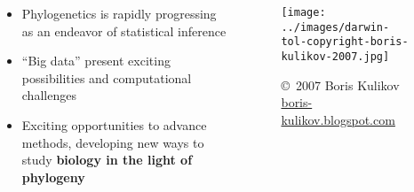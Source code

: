\begin{frame}
    \begin{columns}[c]
        
        \begin{itemize}[<+->]
            \item Phylogenetics is rapidly progressing as an endeavor of
                statistical inference
            \item ``Big data'' present exciting possibilities and computational
                challenges
            \item Exciting opportunities to advance methods, developing new
                ways to study \textbf{biology in the light of phylogeny}
        \end{itemize}
        

        \begin{figure}
            \begin{center}
            \texttt{[image: ../images/darwin-tol-copyright-boris-kulikov-2007.jpg]}
            \caption{\tiny \copyright~2007 Boris Kulikov \href{http://boris-kulikov.blogspot.com/}{boris-kulikov.blogspot.com}}
            \end{center}
        \end{figure}
    \end{columns}
\end{frame}

